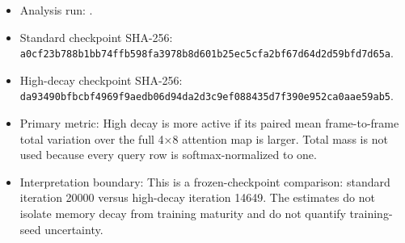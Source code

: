 \documentclass[11pt]{article}
\begin{document}
\begin{itemize}
\item Analysis run: .
\item Standard checkpoint SHA-256: {\footnotesize\texttt{a0cf23b7\allowbreak{}88b1bb74\allowbreak{}ffb598fa\allowbreak{}3978b8d6\allowbreak{}01b25ec5\allowbreak{}cfa2bf67\allowbreak{}d64d2d59\allowbreak{}bfd7d65a}}.
\item High-decay checkpoint SHA-256: {\footnotesize\texttt{da93490b\allowbreak{}fbcbf496\allowbreak{}9f9aedb0\allowbreak{}6d94da2d\allowbreak{}3c9ef088\allowbreak{}435d7f39\allowbreak{}0e952ca0\allowbreak{}aae59ab5}}.
\item Primary metric: High decay is more active if its paired mean frame-to-frame total variation over the full 4×8 attention map is larger. Total mass is not used because every query row is softmax-normalized to one.
\item Interpretation boundary: This is a frozen-checkpoint comparison: standard iteration 20000 versus high-decay iteration 14649. The estimates do not isolate memory decay from training maturity and do not quantify training-seed uncertainty.
\end{itemize}
\end{document}
